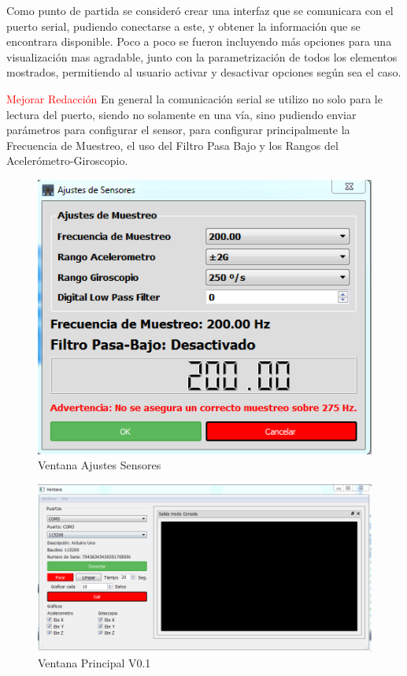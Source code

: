 \documentclass[12pt,a4paper]{article}
\begin{document}
Como punto de partida se consideró crear una interfaz que se comunicara con el puerto serial, pudiendo conectarse a este, y obtener la información que se encontrara disponible.
Poco a poco se fueron incluyendo más opciones para una visualización mas agradable, junto con la parametrización de todos los elementos mostrados, permitiendo al usuario activar y desactivar opciones según sea el caso.

\textcolor{red}{Mejorar Redacción}
En general la comunicación serial se utilizo no solo para le lectura del puerto, siendo no solamente en una vía, sino pudiendo enviar parámetros para configurar el sensor, para configurar principalmente la Frecuencia de Muestreo, el uso del Filtro Pasa Bajo y los Rangos del Acelerómetro-Giroscopio.

\begin{figure}[H]
\centering
  \includegraphics[scale=0.6]{images/AjustesSensores}
  \caption{Ventana Ajustes Sensores}
  \label{fig:ajustessensores}
\end{figure}


\begin{figure}[H]
\centering
  \includegraphics[scale=0.6]{images/mainwindow}
  \caption{Ventana Principal V0.1}
  \label{fig:mainwindow}
\end{figure}
\end{document}
